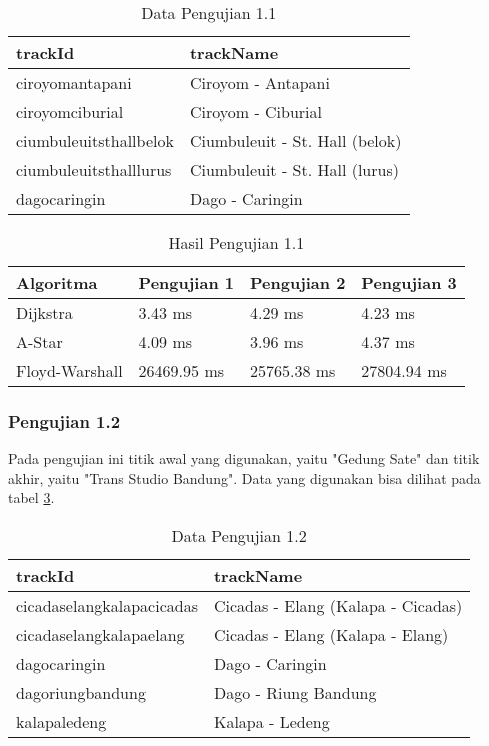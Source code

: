 \renewcommand{\arraystretch}{1.8}
\begin{table}[H]
\centering
\caption{Data Pengujian 1.1}
\label{tab:data1.1}
{\large
\begin{tabular}{|l|l|}
\hline
\textbf{trackId}       & \textbf{trackName}             \\ \hline
ciroyomantapani & Ciroyom - Antapani \\ \hline
ciroyomciburial & Ciroyom - Ciburial \\ \hline
ciumbuleuitsthallbelok   & Ciumbuleuit - St. Hall (belok)     \\ \hline
ciumbuleuitsthalllurus        & Ciumbuleuit - St. Hall (lurus)             \\ \hline
dagocaringin        & Dago - Caringin             \\ \hline
\end{tabular}
}
\end{table}

\renewcommand{\arraystretch}{1.8}
\begin{table}[H]
\centering
\caption{Hasil Pengujian 1.1}
\label{tab:hasiluji1.1}
{\large
\begin{tabular}{|l|l|l|l|}
\hline
\textbf{Algoritma} & \textbf{Pengujian 1} & \textbf{Pengujian 2} & \textbf{Pengujian 3} \\ \hline
Dijkstra           & 3.43 ms              & 4.29 ms             & 4.23 ms              \\ \hline
A-Star            & 4.09 ms              & 3.96 ms              & 4.37 ms              \\ \hline
Floyd-Warshall     & 26469.95 ms              & 25765.38 ms               & 27804.94 ms              \\ \hline
\end{tabular}
}
\end{table}

\subsubsection{Pengujian 1.2}
Pada pengujian ini titik awal yang digunakan, yaitu "Gedung Sate" dan titik akhir, yaitu "Trans Studio Bandung". Data yang digunakan bisa dilihat pada tabel \ref{tab:data1.2}.

\renewcommand{\arraystretch}{1.8}
\begin{table}[H]
\centering
\caption{Data Pengujian 1.2}
\label{tab:data1.2}
{\large
\begin{tabular}{|l|l|}
\hline
\textbf{trackId}       & \textbf{trackName}             \\ \hline
cicadaselangkalapacicadas & Cicadas - Elang (Kalapa - Cicadas) \\ \hline
cicadaselangkalapaelang & Cicadas - Elang (Kalapa - Elang) \\ \hline
dagocaringin   & Dago - Caringin     \\ \hline
dagoriungbandung        & Dago - Riung Bandung             \\ \hline
kalapaledeng        & Kalapa - Ledeng             \\ \hline
\end{tabular}
}
\end{table}


